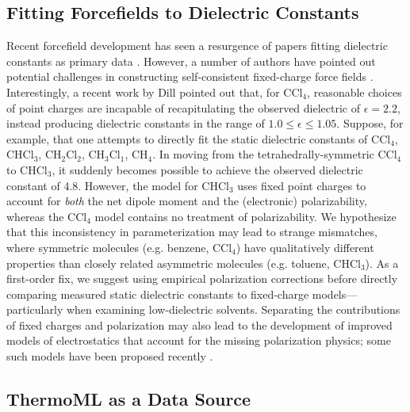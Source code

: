\documentclass[journal=jacsat,manuscript=article]{achemso}
\begin{document}
\subsection{Fitting Forcefields to Dielectric Constants}

Recent forcefield development has seen a resurgence of papers fitting dielectric constants as primary data \cite{wang2014building, fennell2014fixed}.  However, a number of authors have pointed out potential challenges in constructing self-consistent fixed-charge force fields \cite{fennell2012simple, leontyev2014polarizable}.  Interestingly, a recent work by Dill \cite{fennell2012simple} pointed out that, for $\mathrm{CCl_4}$, reasonable choices of point charges are incapable of recapitulating the observed dielectric of $\epsilon = 2.2$, instead producing dielectric constants in the range of $1.0 \le \epsilon \le 1.05$.  Suppose, for example, that one attempts to directly fit the static dielectric constants of $\mathrm{CCl_4}$, $\mathrm{CHCl_3}$, $\mathrm{CH_2Cl_2}$, $\mathrm{CH_3Cl_1}$, $\mathrm{CH_4}$.  In moving from the tetrahedrally-symmetric $\mathrm{CCl_4}$ to $\mathrm{CHCl_3}$, it suddenly becomes possible to achieve the observed dielectric constant of 4.8.  However, the model for $\mathrm{CHCl_3}$ uses fixed point charges to account for \emph{both} the net dipole moment and the (electronic) polarizability, whereas the $\mathrm{CCl_4}$ model contains no treatment of polarizability.  We hypothesize that this inconsistency in parameterization may lead to strange mismatches, where symmetric molecules (e.g. benzene, $\mathrm{CCl_4}$) have qualitatively different properties than closely related asymmetric molecules (e.g. toluene, $\mathrm{CHCl_3}$).  As a first-order fix, we suggest using empirical polarization corrections before directly comparing measured static dielectric constants to fixed-charge models---particularly when examining low-dielectric solvents.  Separating the contributions of fixed charges and polarization may also lead to the development of improved models of electrostatics that account for the missing polarization physics; some such models have been proposed recently \cite{leontyev2014polarizable}.


\subsection{ThermoML as a Data Source}
\end{document}
